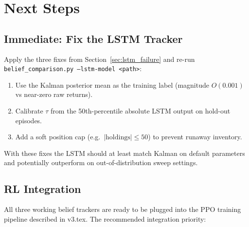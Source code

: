 \documentclass[11pt]{article}
\begin{document}
\section{Next Steps}

\subsection{Immediate: Fix the LSTM Tracker}

Apply the three fixes from Section~\ref{sec:lstm_failure} and re-run
\texttt{belief\_comparison.py --lstm-model <path>}:
\begin{enumerate}[leftmargin=1.5em]
  \item Use the Kalman posterior mean as the training label (magnitude $O(0.001)$
    vs near-zero raw returns).
  \item Calibrate $\tau$ from the 50th-percentile absolute LSTM output on
    hold-out episodes.
  \item Add a soft position cap (e.g.\ $|\text{holdings}| \leq 50$) to prevent
    runaway inventory.
\end{enumerate}
With these fixes the LSTM should at least match Kalman on default parameters
and potentially outperform on out-of-distribution sweep settings.

\subsection{RL Integration}

All three working belief trackers are ready to be plugged into the PPO
training pipeline described in v3.tex.
The recommended integration priority:
\end{document}
